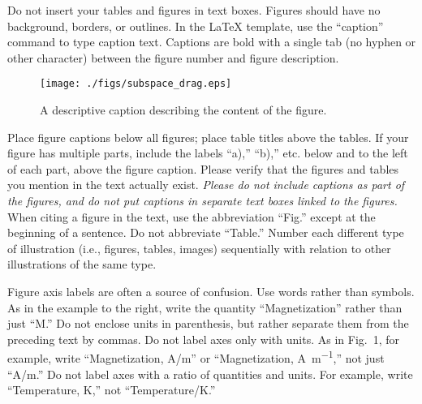 Do not insert your tables and figures in text boxes. Figures should have no background, borders, or outlines. In the \LaTeX{} template, use the ``caption'' command to type caption text. Captions are bold with a single tab (no hyphen or other character) between the figure number and figure description.



\begin{figure}[hbt!]
\centering
\texttt{[image: ./figs/subspace\_drag.eps]}
\caption{A descriptive caption describing the content of the figure.}
\end{figure}

Place figure captions below all figures; place table titles above the tables. If your figure has multiple parts, include the labels ``a),'' ``b),'' etc. below and to the left of each part, above the figure caption. Please verify that the figures and tables you mention in the text actually exist. \emph{Please do not include captions as part of the figures, and do not put captions in separate text boxes linked to the figures.} When citing a figure in the text, use the abbreviation ``Fig.'' except at the beginning of a sentence. Do not abbreviate ``Table.'' Number each different type of illustration (i.e., figures, tables, images) sequentially with relation to other illustrations of the same type.

Figure axis labels are often a source of confusion. Use words rather than symbols. As in the example to the right, write the quantity ``Magnetization'' rather than just ``M.'' Do not enclose units in parenthesis, but rather separate them from the preceding text by commas. Do not label axes only with units. As in Fig.~1, for example, write ``Magnetization, \si[per-mode=symbol]{\ampere\per\meter}'' or ``Magnetization, \si[inter-unit-product=\ensuremath{{}\cdot{}}]{\ampere\per\meter},'' not just ``A/m.'' Do not label axes with a ratio of quantities and units. For example, write ``Temperature, K,'' not ``Temperature/K.''

